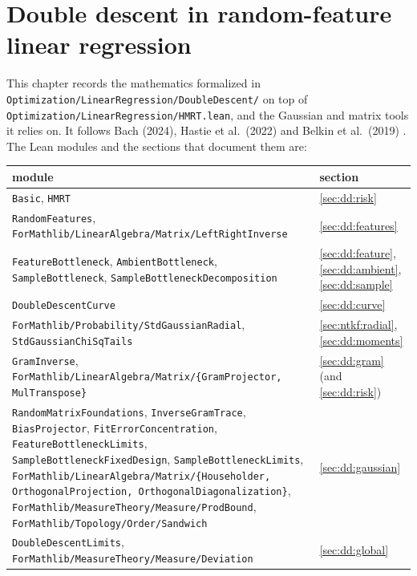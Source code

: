 \chapter{Double descent in random-feature linear regression}\label{chap:dd}

This chapter records the mathematics formalized in
\texttt{Optimization/LinearRegression/DoubleDescent/} on top of \texttt{Optimization/LinearRegression/HMRT.lean}, and the Gaussian and matrix tools it relies on. It follows
Bach (2024), Hastie et al.\ (2022) and Belkin et al.\ (2019) \cite{bach2024highdim,hastie2022surprises,belkin2019reconciling}. The Lean modules and the sections that document them are:
\begin{center}
\small
\begin{tabular}{p{}p{}}
module & section\\ \hline
\texttt{Basic}, \texttt{HMRT} & \ref{sec:dd:risk}\\
\texttt{RandomFeatures}, \texttt{ForMathlib/LinearAlgebra/Matrix/LeftRightInverse} & \ref{sec:dd:features}\\
\texttt{FeatureBottleneck}, \texttt{AmbientBottleneck}, \texttt{SampleBottleneck}, \texttt{SampleBottleneckDecomposition} & \ref{sec:dd:feature}, \ref{sec:dd:ambient}, \ref{sec:dd:sample}\\
\texttt{DoubleDescentCurve} & \ref{sec:dd:curve}\\
\texttt{ForMathlib/Probability/StdGaussianRadial}, \texttt{StdGaussianChiSqTails} & \ref{sec:ntkf:radial}, \ref{sec:dd:moments}\\
\texttt{GramInverse}, \texttt{ForMathlib/LinearAlgebra/Matrix/\{GramProjector, MulTranspose\}} & \ref{sec:dd:gram} (and \ref{sec:dd:risk})\\
\texttt{RandomMatrixFoundations}, \texttt{InverseGramTrace}, \texttt{BiasProjector}, \texttt{FitErrorConcentration}, \texttt{FeatureBottleneckLimits},
\texttt{SampleBottleneckFixedDesign}, \texttt{SampleBottleneckLimits},
\texttt{ForMathlib/LinearAlgebra/Matrix/\{Householder, OrthogonalProjection, OrthogonalDiagonalization\}},
\texttt{ForMathlib/MeasureTheory/Measure/ProdBound}, \texttt{ForMathlib/Topology/Order/Sandwich} & \ref{sec:dd:gaussian}\\
\texttt{DoubleDescentLimits}, \texttt{ForMathlib/MeasureTheory/Measure/Deviation} & \ref{sec:dd:global}
\end{tabular}
\end{center}

